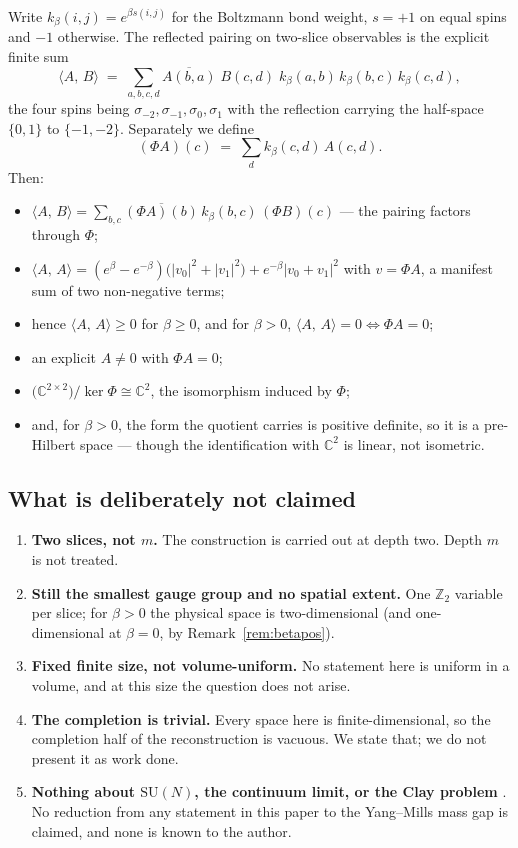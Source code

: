 \documentclass[11pt]{article}
\theoremstyle{definition}
\newcommand{\C}{\mathbb{C}}
\newcommand{\Z}{\mathbb{Z}}
\newcommand{\SU}{\mathrm{SU}}
\newcommand{\inn}[2]{\langle #1,\, #2\rangle}
\begin{document}
Write $k_\beta(i,j) = e^{\beta s(i,j)}$ for the Boltzmann bond weight, $s=+1$ on
equal spins and $-1$ otherwise.  The reflected pairing on two-slice observables
is the explicit finite sum
\[
  \inn{A}{B} \;=\; \sum_{a,b,c,d}
     \overline{A(b,a)}\; B(c,d)\; k_\beta(a,b)\,k_\beta(b,c)\,k_\beta(c,d),
\]
the four spins being $\sigma_{-2},\sigma_{-1},\sigma_0,\sigma_1$ with the
reflection carrying the half-space $\{0,1\}$ to $\{-1,-2\}$.  Separately we
define
\[
  (\Phi A)(c) \;=\; \sum_d k_\beta(c,d)\, A(c,d).
\]
Then:
\begin{itemize}
\item $\inn{A}{B} = \sum_{b,c}\overline{(\Phi A)(b)}\,k_\beta(b,c)\,(\Phi B)(c)$
      --- the pairing factors through $\Phi$;
\item $\inn{A}{A} = (e^\beta-e^{-\beta})\bigl(|v_0|^2+|v_1|^2\bigr)
      + e^{-\beta}|v_0+v_1|^2$ with $v=\Phi A$, a manifest sum of two
      non-negative terms;
\item hence $\inn{A}{A}\ge 0$ for $\beta\ge 0$, and for $\beta>0$,
      $\inn{A}{A}=0 \iff \Phi A = 0$;
\item an explicit $A\neq 0$ with $\Phi A = 0$;
\item $\bigl(\C^{2\times 2}\bigr)/\ker\Phi \cong \C^2$, the isomorphism
      induced by $\Phi$;
\item and, for $\beta>0$, the form the quotient carries is positive definite,
      so it is a pre-Hilbert space --- though the identification with
      $\C^2$ is linear, not isometric.
\end{itemize}

\subsection{What is deliberately not claimed}

\begin{enumerate}
\item \textbf{Two slices, not $m$.}  The construction is carried out at depth
two.  Depth $m$ is not treated.
\item \textbf{Still the smallest gauge group and no spatial extent.}  One
$\Z_2$ variable per slice; for $\beta>0$ the physical space is two-dimensional
(and one-dimensional at $\beta=0$, by Remark~\ref{rem:betapos}).
\item \textbf{Fixed finite size, not volume-uniform.}  No statement here is
uniform in a volume, and at this size the question does not arise.
\item \textbf{The completion is trivial.}  Every space here is
finite-dimensional, so the completion half of the reconstruction is vacuous.  We
state that; we do not present it as work done.
\item \textbf{Nothing about $\SU(N)$, the continuum limit, or the Clay problem}
\cite{Clay}.  No reduction from any statement in this paper to the Yang--Mills
mass gap is claimed, and none is known to the author.
\end{enumerate}
\end{document}
